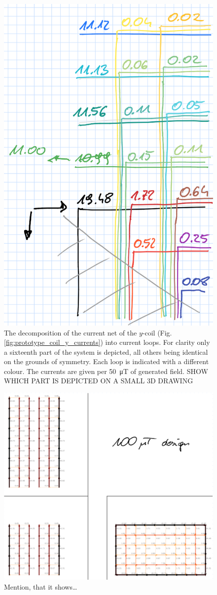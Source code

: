 \begin{figure}
  \centering
  \includegraphics[width=0.4\linewidth]{gfx/prototype/coil_y_decomposition.png}
  \caption{The decomposition of the current net of the $y$-coil (Fig.\,\ref{fig:prototype_coil_y_currents}) into current loops. For clarity only a sixteenth part of the system is depicted, all others being identical on the grounds of symmetry. Each loop is indicated with a different colour. The currents are given per \SI{50}{\micro\tesla} of generated field. SHOW WHICH PART IS DEPICTED ON A SMALL 3D DRAWING}
  \label{fig:prototype_coil_y_decomposition}
\end{figure}

\begin{figure}
  \centering
  \includegraphics[width=0.9\linewidth]{gfx/prototype/coil_x_z_currents.png}
  \caption{Mention, that it shows\ldots}
  \label{fig:prototype_coil_x_z_currents}
\end{figure}

